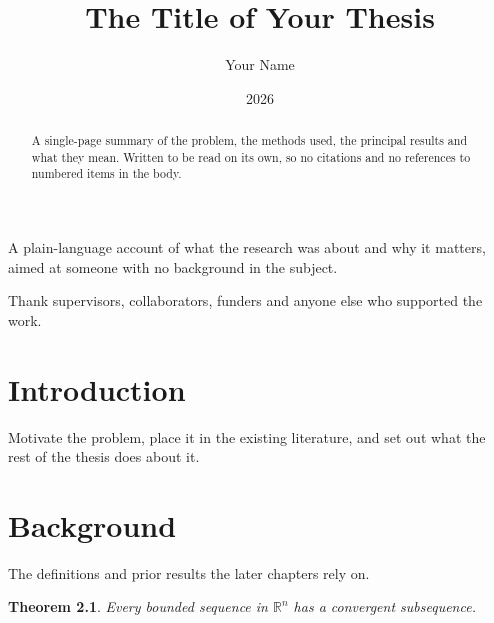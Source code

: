 \documentclass[11pt,oneside]{report}
\title{The Title of Your Thesis}
\author{Your Name}
\date{2026}
\theoremstyle{plain}
\newtheorem{theorem}{Theorem}[chapter]
\theoremstyle{definition}
\begin{document}
\maketitle

\declaration{}

\begin{abstract}
  A single-page summary of the problem, the methods used, the principal
  results and what they mean. Written to be read on its own, so no citations
  and no references to numbered items in the body.
\end{abstract}

\begin{laysummary}
  A plain-language account of what the research was about and why it matters,
  aimed at someone with no background in the subject.
\end{laysummary}

\begin{acknowledgements}
  Thank supervisors, collaborators, funders and anyone else who supported the
  work.
\end{acknowledgements}

\dedication{For someone.}

\tableofcontents

\chapter{Introduction}
\label{ch:intro}
Motivate the problem, place it in the existing literature, and set out what
the rest of the thesis does about it.

\chapter{Background}
\label{ch:background}
The definitions and prior results the later chapters rely on.

\begin{theorem}
  \label{thm:example}
  Every bounded sequence in $\mathbb{R}^n$ has a convergent subsequence.
\end{theorem}
\end{document}
